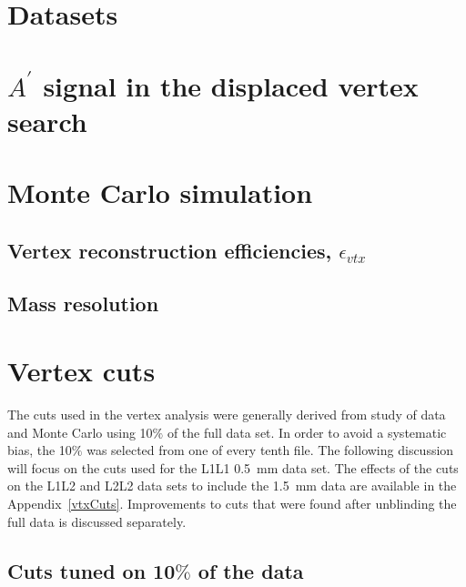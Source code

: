 \documentclass[12pt]{report}
\begin{document}
\section{Datasets}


\section{$A^{\prime}$ signal in the displaced vertex search}


\section{Monte Carlo simulation}


\subsection{Vertex reconstruction efficiencies, $\epsilon_{vtx}$}


\subsection{Mass resolution}



\section{Vertex cuts}
The cuts used in the vertex analysis were generally derived from study of data and Monte Carlo using 10$\%$ of the full data set. In order to avoid a systematic bias, the 10$\%$ was selected from one of every tenth file. The following discussion will focus on the cuts used for the L1L1 0.5~mm data set. The effects of the cuts on the L1L2 and L2L2 data sets to include the 1.5~mm data are available in the Appendix~\ref{vtxCuts}. Improvements to cuts that were found after unblinding the full data is discussed separately.\\ 
\subsection{Cuts tuned on 10$\%$ of the data}

\end{document}
